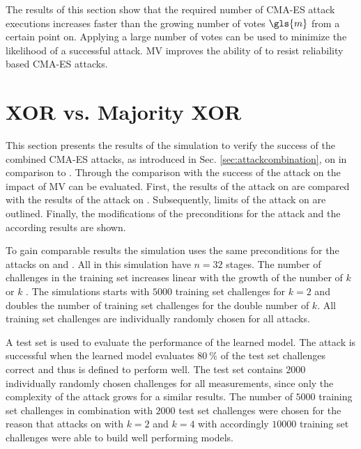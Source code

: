 The results of this section show that the required number of \ac{CMA-ES} attack executions increases faster than the growing number of votes $\gls{m}$ from a certain point on.
Applying a large number of votes can be used to minimize the likelihood of a successful attack.
\ac{MV} improves the ability of \apufs to resist reliability based \ac{CMA-ES} attacks.


\section{\acs{XOR} \apufs vs. Majority \acs{XOR} \apufs}
\label{sec:xorarbitervsmajorityxorarbiter}


This section presents the results of the simulation to verify the success of the combined \ac{CMA-ES} attacks, as introduced in Sec. \ref{sec:attackcombination}, on \mxpufs in comparison to \xpufs.
Through the comparison with the success of the attack on \xpuf the impact of \ac{MV} can be evaluated.
First, the results of the attack on \xpufs are compared with the results of the attack on \mxpufs.
Subsequently, limits of the attack on \mxpufs are outlined.
Finally, the modifications of the preconditions for the attack and the according results are shown.

To gain comparable results the simulation uses the same preconditions for the attacks on \xpufs and \mxpufs.
All \pufs in this simulation have $n = 32$ stages.
The number of challenges in the training set increases linear with the growth of the number of $k$ \apufs or $k$ \mpufs.
The simulations starts with $5000$ training set challenges for $k = 2$ and doubles the number of training set challenges for the double number of $k$.
All training set challenges are individually randomly chosen for all attacks.

A test set is used to evaluate the performance of the learned model.
The attack is successful when the learned model evaluates $80\ \%$ of the test set challenges correct and thus is defined to perform well.
The test set contains $2000$ individually randomly chosen challenges for all measurements, since only the complexity of the attack grows for a similar results.
The number of $5000$ training set challenges in combination with $2000$ test set challenges were chosen for the reason that attacks on \xpufs with $k = 2$ and $k = 4$ with accordingly $10000$ training set challenges were able to build well performing models.

